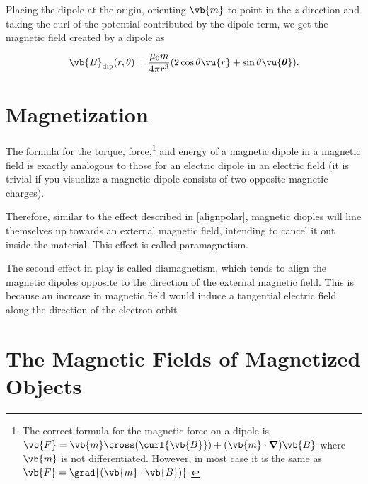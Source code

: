 \documentclass[english,a4paper,12pt]{report}
\begin{document}
Placing the dipole at the origin, orienting \(\vb{m} \) to point in the \(z\) direction and taking the curl of the potential contributed by the dipole term, we get the magnetic field created by a dipole as

\begin{equation}
    \vb{B} _{\text{dip} } (r, \theta ) = \frac{\mu_0 m}{4\pi r^3 }(2\cos \theta \vu{r} + \sin \theta \vu{\boldsymbol{\theta } }). 
\end{equation}

\section{Magnetization}



The formula for the torque, force,\footnote{The correct formula for the magnetic force on a dipole is \(\vb{F} = \vb{m} \cross (\curl{\vb{B} } ) + (\vb{m} \cdot \boldsymbol{\nabla } )\vb{B} \) where \(\vb{m} \) is not differentiated. However, in most case it is the same as \(\vb{F} = \grad{(\vb{m} \cdot \vb{B} )}\).}  and energy of a magnetic dipole in a magnetic field is exactly analogous to those for an electric dipole in an electric field (it is trivial if you visualize a magnetic dipole consists of two opposite magnetic charges).

Therefore, similar to the effect described in \cref{alignpolar}, magnetic dioples will line themselves up towards an external magnetic field, intending to cancel it out inside the material. This effect is called paramagnetism. 

The second effect in play is called diamagnetism, which tends to align the magnetic dipoles opposite to the direction of the external magnetic field. This is because an increase in magnetic field would induce a tangential electric field along the direction of the electron orbit



\section{The Magnetic Fields of Magnetized Objects}
\end{document}
